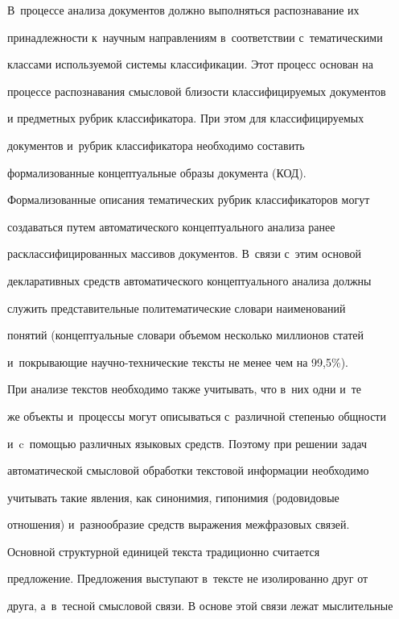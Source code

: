 

В~процессе анализа документов должно выполняться распознавание их 


принадлежности к~научным направлениям в~соответствии с~тематическими 


классами используемой системы классификации. Этот процесс основан на 


процессе распознавания смысловой близости классифицируемых документов 


и предметных рубрик классификатора. При этом для классифицируемых 


документов и~рубрик классификатора необходимо составить 


формализованные концептуальные образы документа (КОД). 


Формализованные описания тематических рубрик классификаторов могут 


создаваться путем автоматического концептуального анализа ранее 


расклассифицированных массивов документов. В~связи с~этим основой 


декларативных средств автоматического концептуального анализа должны 


служить представительные политематические словари наименований 


понятий (концептуальные словари объемом несколько миллионов статей 


и~покрывающие научно-технические тексты не менее чем на 99,5\%).


     При анализе текстов необходимо также учитывать, что в~них одни и~те 


же объекты и~процессы могут описываться с~различной степенью общности 


и~c~по\-мощью различных языковых средств. Поэтому при решении задач 


автоматической смысловой обработки текстовой информации необходимо 


учитывать такие явления, как синонимия, гипонимия (родовидовые 


отношения) и~разнообразие средств выражения межфразовых связей. 


     


     Основной структурной единицей текста традиционно считается 


предложение. Предложения выступают в~тексте не изолированно друг от 


друга, а~в~тесной смысловой связи. В основе этой связи лежат мыслительные 



